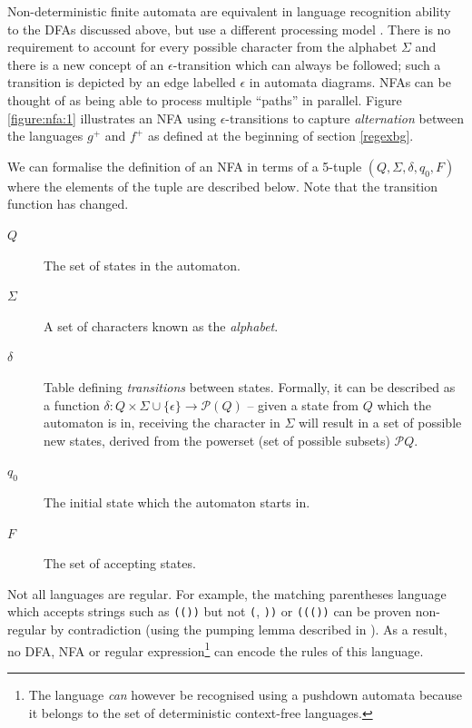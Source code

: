 \documentclass[a4paper,openany,12pt]{book}
\begin{document}
Non-deterministic finite automata are equivalent in language recognition ability to the DFAs discussed above, but use a
different processing model \citep[p.~46]{sipser2012introduction}.
There is no requirement to account for every possible character from the alphabet $\Sigma$ and there is a new concept of
an $\epsilon$-transition which can always be followed; such a transition is depicted by an edge labelled $\epsilon$ in
automata diagrams.
NFAs can be thought of as being able to process multiple ``paths'' in parallel.
Figure \ref{figure:nfa:1} illustrates an NFA using $\epsilon$-transitions to capture \emph{alternation} between the
languages $g^+$ and $f^+$ as defined at the beginning of section \ref{regexbg}.

We can formalise the definition of an NFA in terms of a 5-tuple $(Q, \Sigma, \delta, q_0, F)$ where the elements of the
tuple are described below.
Note that the transition function has changed.

\begin{description}
\item[$Q$] The set of states in the automaton.
\item[$\Sigma$] A set of characters known as the \emph{alphabet}.
\item[$\delta$] Table defining \emph{transitions} between states. Formally, it can be described as a function
                $\delta : Q \times \Sigma \cup \{\epsilon\} \rightarrow \mathcal{P}(Q)$ -- given a state from $Q$ which
                the automaton is in, receiving the character in $\Sigma$ will result in a set of possible new states,
                derived from the powerset (set of possible subsets) $\mathcal{P}Q$.
\item[$q_0$] The initial state which the automaton starts in.
\item[$F$] The set of accepting states.
\end{description}

Not all languages are regular.
For example, the matching parentheses language which accepts strings such as \texttt{(())} but not \texttt{(},
\texttt{))} or \texttt{((())} can be proven non-regular by contradiction (using the pumping lemma described in
\citet{rabin1959finite}).
As a result, no DFA, NFA or regular expression\footnote{The language \emph{can} however be recognised using a pushdown
automata because it belongs to the set of deterministic context-free languages.} can encode the rules of this language.
\end{document}
